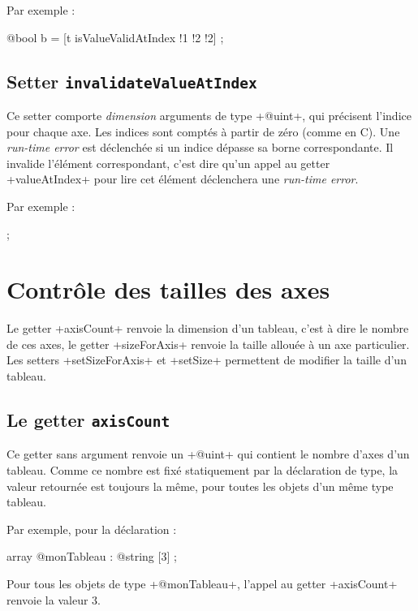Par exemple :
\begin{galgas3}
  @bool b = [t isValueValidAtIndex !1 !2 !2] ;
\end{galgas3}


\subsection{Setter \texttt{invalidateValueAtIndex}}

Ce setter comporte \emph{dimension} arguments de type \ggst+@uint+, qui précisent l'indice pour chaque axe. Les indices sont comptés à partir de zéro (comme en C). Une \emph{run-time error} est déclenchée si un indice dépasse sa borne correspondante. Il invalide l'élément correspondant, c'est dire qu'un appel au getter \ggst+valueAtIndex+ pour lire cet élément déclenchera une \emph{run-time error}.

Par exemple :
\begin{galgas3}
  [!?t invalidateValueAtIndex !1 !2 !2] ;
\end{galgas3}





\section{Contrôle des tailles des axes}

Le getter \ggst+axisCount+ renvoie la dimension d'un tableau, c'est à dire le nombre de ces axes, le getter \ggst+sizeForAxis+ renvoie la taille allouée à un axe particulier. Les setters \ggst+setSizeForAxis+ et \ggst+setSize+ permettent de modifier la taille d'un tableau.



\subsection{Le getter \texttt{axisCount}}

Ce getter sans argument renvoie un \ggst+@uint+ qui contient le nombre d'axes d'un tableau. Comme ce nombre est fixé statiquement par la déclaration de type, la valeur retournée est toujours la même, pour toutes les objets d'un même type tableau.


Par exemple, pour la déclaration :
\begin{galgas3}
array @monTableau : @string [3] ;
\end{galgas3}
Pour tous les objets de type \ggst+@monTableau+, l'appel au getter \ggst+axisCount+ renvoie la valeur $3$.


